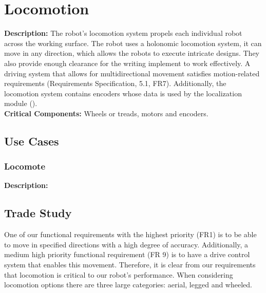 
\section{Locomotion}
\label{sec:locomotion}
\textbf{Description:} The robot's locomotion system propels each individual robot across the working surface. The robot uses a holonomic locomotion system, it can move in any direction, which allows the robots to execute intricate designs.  They also provide enough clearance for the writing implement to work effectively. A driving system that allows for multidirectional movement satisfies motion-related requirements (Requirements Specification, 5.1, FR7). Additionally, the locomotion system contains encoders whose data is used by the localization module (). \\

\noindent
\textbf{Critical Components:} Wheels or treads, motors and encoders.

\subsection{Use Cases}
\subsubsection{Locomote}
\textbf{Description:} 

\subsection{Trade Study}
\label{sec:trade_locomotion}
One of our functional requirements with the highest priority (FR1) is to be able to move in specified directions with a high degree of accuracy. Additionally, a medium high priority functional requirement (FR 9) is to have a drive control system that enables this movement. Therefore, it is clear from our requirements that locomotion is critical to our robot's performance. When considering locomotion options there are three large categories: aerial, legged and wheeled.

